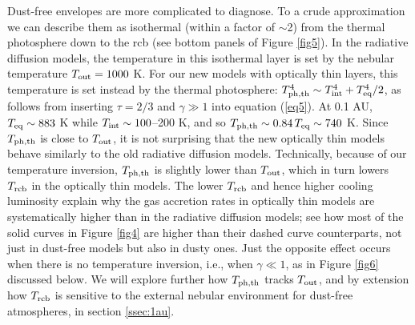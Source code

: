 \documentclass[fleqn,useAMS,usenatbib]{mnras}
\begin{document}
Dust-free envelopes are more complicated to diagnose.
To a crude approximation we can describe them as isothermal
(within a factor of $\sim$2) 
from the thermal photosphere down to the rcb 
(see bottom panels of Figure \ref{fig5}).
In the radiative diffusion models,
the temperature in this isothermal layer is set by the nebular temperature
$T_{\rm out} = 1000$ K.
For our new models with optically thin layers,
this temperature is set instead by the thermal photosphere:
$T_{\rm ph,th}^4 \sim T_{\rm int}^4 + T_{\rm eq}^4/2$, as follows
from inserting $\tau=2/3$ and $\gamma \gg 1$
into equation (\ref{eq5}). At 0.1 AU, $T_{\rm eq} \sim 883$ K
while $T_{\rm int} \sim 100$--200 K,
and so $T_{\rm ph,th} \sim 0.84\,T_{\rm eq} \sim 740$ K.
Since $T_{\rm ph,th}$ is close to $T_{\rm out}$,
it is not surprising that the new optically thin models behave
similarly to the old radiative diffusion models.
Technically, because of our temperature inversion,
$T_{\rm ph,th}$ is slightly lower than $T_{\rm out}$,
which in turn lowers $T_{\rm rcb}$ in the optically
thin models. The lower $T_{\rm rcb}$ and hence higher cooling luminosity
explain why the gas accretion rates in optically thin models 
are systematically higher than in the radiative diffusion
models; see how most of the solid curves in Figure \ref{fig4} are
higher than their dashed curve counterparts, not just in dust-free
models but also in dusty ones. Just the opposite effect occurs
when there is no temperature inversion, i.e., when $\gamma \ll 1$,
as in Figure \ref{fig6} discussed below.
We will explore further how $T_{\rm ph,th}$
tracks $T_{\rm out}$, and by extension how $T_{\rm rcb}$ 
is sensitive to the external
nebular environment for dust-free atmospheres,
in section \ref{ssec:1au}.
\end{document}
